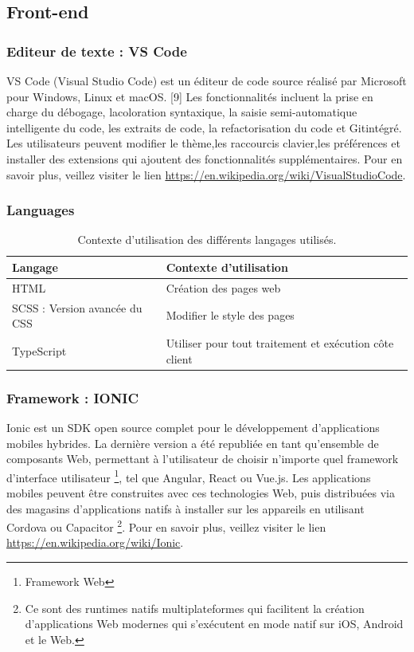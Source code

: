 \subsection{Front-end}
\subsubsection{Editeur de texte : VS Code}
 VS Code (Visual Studio Code) est un éditeur de code source réalisé par Microsoft pour Windows, Linux et macOS. [9] Les fonctionnalités incluent la prise en charge du débogage, lacoloration syntaxique, la saisie semi-automatique intelligente du code, les extraits de code, la refactorisation du code et Gitintégré. Les utilisateurs peuvent modifier le thème,les raccourcis clavier,les préférences et installer des extensions qui ajoutent des fonctionnalités supplémentaires. Pour en savoir plus, veillez visiter le lien \href{https://en.wikipedia.org/wiki/Visual_Studio_Code}{https://en.wikipedia.org/wiki/VisualStudioCode}.

\subsubsection{Languages}
\begin{table}[h]
 \begin{tabular}{|m{6cm}|m{10cm}|}
 	\hline
 	\textbf{Langage} & \textbf{Contexte d’utilisation} \\
 	\hline
 	HTML & Création des pages web \\
 	\hline
 	SCSS : Version avancée du CSS & Modifier le style des pages \\
 	\hline
 	TypeScript & Utiliser pour tout traitement et exécution côte client \\
 	\hline
 \end{tabular}
\caption{Contexte d’utilisation des différents langages utilisés.}
\end{table}

\subsubsection{Framework : IONIC}
\label{IONIC}
Ionic est un SDK open source complet pour le développement d’applications mobiles hybrides. La dernière version a été republiée en tant qu’ensemble de composants Web, permettant à l’utilisateur de choisir n’importe quel framework d’interface utilisateur \footnote{Framework Web}, tel que Angular, React ou Vue.js. Les applications mobiles peuvent être construites avec ces technologies Web, puis distribuées via des magasins d’applications natifs à installer sur les appareils en utilisant Cordova ou Capacitor \footnote{Ce sont des runtimes natifs multiplateformes qui facilitent la création d’applications Web modernes qui s’exécutent en mode natif sur iOS, Android et le Web.}. Pour en savoir plus, veillez visiter le lien \href{https://en.wikipedia.org/wiki/Ionic_(mobile_app_framework)}{https://en.wikipedia.org/wiki/Ionic}.

